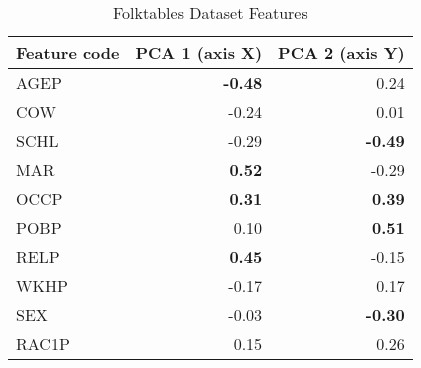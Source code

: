 \begin{table}[h]
\centering
\caption{Folktables Dataset Features}
\label{tab:folktables-pca-profiles}
\begin{tabular}{lrr}
\hline
\textbf{Feature code} & \textbf{PCA 1 (axis X)}  & \textbf{PCA 2 (axis Y)} \\
\hline
AGEP & \textbf{-0.48} & 0.24 \\
COW & -0.24 & 0.01 \\
SCHL & -0.29 & \textbf{-0.49} \\
MAR & \textbf{0.52} & -0.29 \\
OCCP & \textbf{0.31} & \textbf{0.39} \\
POBP & 0.10 & \textbf{0.51} \\
RELP & \textbf{0.45} & -0.15 \\
WKHP & -0.17 & 0.17 \\
SEX & -0.03 & \textbf{-0.30} \\
RAC1P & 0.15 & 0.26 \\
\hline
\end{tabular}
\end{table}